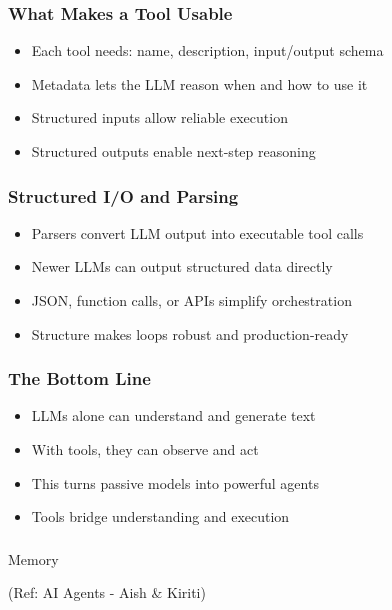 \begin{frame}[fragile]\frametitle{What Makes a Tool Usable}
      \begin{itemize}
        \item Each tool needs: name, description, input/output schema
        \item Metadata lets the LLM reason when and how to use it
        \item Structured inputs allow reliable execution
        \item Structured outputs enable next-step reasoning
      \end{itemize}
\end{frame}

\begin{frame}[fragile]\frametitle{Structured I/O and Parsing}
      \begin{itemize}
        \item Parsers convert LLM output into executable tool calls
        \item Newer LLMs can output structured data directly
        \item JSON, function calls, or APIs simplify orchestration
        \item Structure makes loops robust and production-ready
      \end{itemize}
\end{frame}

\begin{frame}[fragile]\frametitle{The Bottom Line}
      \begin{itemize}
        \item LLMs alone can understand and generate text
        \item With tools, they can observe and act
        \item This turns passive models into powerful agents
        \item Tools bridge understanding and execution
      \end{itemize}
\end{frame}

\begin{frame}[fragile]\frametitle{}
\begin{center}
{\Large Memory}

{\tiny (Ref: AI Agents - Aish \& Kiriti)}
\end{center}
\end{frame}

